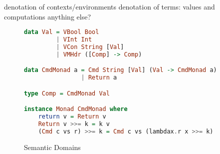 denotation of contexts/environments
denotation of terms: values and computations
anything else?

\begin{comment}
\begin{figure}[float]
\begin{syntax}
\slab{\textbf{Value}}& v &::=& b \mid i \mid k~\many{v} \mid h\\
\slab{\textbf{CommandMonad}}& m~a &::=& a \mid c~\many{a}~r\\
\slab{\textbf{Comp}}& e &::=& m~v
\end{syntax}
\caption{Semantic Domains}
\label{fig:eval-comp}
\end{figure}
\end{comment}

\begin{figure}[float]
\begin{lstlisting}[language=Haskell,basicstyle=\sffamily\scriptsize\upshape]
data Val = VBool Bool
         | VInt Int
         | VCon String [Val]
         | VMHdr ([Comp] -> Comp)

data CmdMonad a = Cmd String [Val] (Val -> CmdMonad a)
                | Return a

type Comp = CmdMonad Val

instance Monad CmdMonad where
    return v = Return v
    Return v >>= k = k v
    (Cmd c vs r) >>= k = Cmd c vs (lambdax.r x >>= k)
\end{lstlisting}
\caption{Semantic Domains}
\label{fig:eval-comp}
\end{figure}

